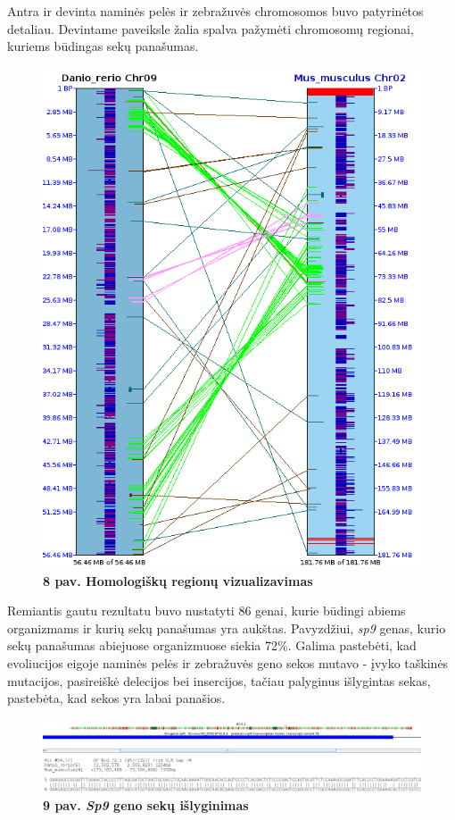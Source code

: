 \documentclass[12pt]{article}
\begin{document}
Antra ir devinta naminės pelės ir zebražuvės chromosomos buvo patyrinėtos
detaliau. Devintame paveiksle žalia spalva pažymėti chromosomų regionai, kuriems
būdingas sekų panašumas.

\begin{figure}[htb]
    \begin{center}
        \includegraphics[width=0.4\linewidth]{../Figures/Chr2_9_synteny.png}
        \vspace{-1\baselineskip}
        \caption*{\small\textbf{8 pav. Homologiškų regionų vizualizavimas}}
        \label{fig:8}
    \end{center}
\end{figure}

\newpage

Remiantis gautu rezultatu buvo nustatyti 86 genai, kurie būdingi abiems
organizmams ir kurių sekų panašumas yra aukštas. Pavyzdžiui, \emph{sp9} genas,
kurio sekų panašumas abiejuose organizmuose siekia 72\%. Galima pastebėti, kad
evoliucijos eigoje naminės pelės ir zebražuvės geno sekos mutavo - įvyko
taškinės mutacijos, pasireiškė delecijos bei insercijos, tačiau palyginus
išlygintas sekas, pastebėta, kad sekos yra labai panašios.

\begin{figure}[htb]
    \begin{center}
        \includegraphics[width=1\linewidth]{../Figures/Sp9_gene_alignment.png}
        \vspace{-1\baselineskip}
        \caption*{\small\textbf{9 pav. \emph{Sp9} geno sekų išlyginimas}}
        \label{fig:9}
    \end{center}
\end{figure}
\end{document}

